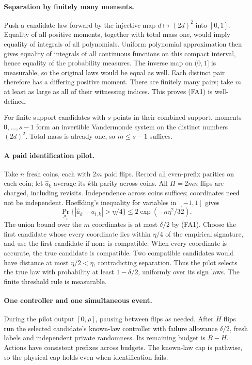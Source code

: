 \paragraph{Separation by finitely many moments.}
Push a candidate law forward by the injective map $d\mapsto(2d)^2$ into
$[0,1]$. Equality of all positive moments, together with total mass one,
would imply equality of integrals of all polynomials. Uniform polynomial
approximation then gives equality of integrals of all continuous functions
on this compact interval, hence equality of the probability measures.
The inverse map on $(0,1]$ is measurable, so the original laws would be
equal as well. Each distinct pair therefore has a differing positive
moment. There are finitely many pairs; take $m$ at least as large as all
of their witnessing indices. This proves (FA1) is well-defined.

For finite-support candidates with $s$ points in their combined support,
moments $0,\ldots,s-1$ form an invertible Vandermonde system on the distinct
numbers $(2d)^2$. Total mass is already one, so $m\le s-1$ suffices.

\paragraph{A paid identification pilot.}
Take $n$ fresh coins, each with $2m$ paid flips. Record all even-prefix
parities on each coin; let $\widehat a_k$ average its $k$th parity across
coins. All $H=2mn$ flips are charged, including revisits. Independence
across coins suffices; coordinates need not be independent.
Hoeffding's inequality for variables in $[-1,1]$ gives
\[
 \Pr_{\mu_i}\{|\widehat a_k-a_{i,k}|>\eta/4\}
 \le2\exp(-n\eta^2/32).
\]
The union bound over the $m$ coordinates is at most $\delta/2$ by (FA1).
Choose the first candidate whose every coordinate lies within $\eta/4$
of the empirical signature, and use the first candidate if none is
compatible. When every coordinate is accurate, the true candidate is
compatible. Two compatible candidates would have distance at most
$\eta/2<\eta$, contradicting separation. Thus the pilot selects the true
law with probability at least $1-\delta/2$, uniformly over its sign laws.
The finite threshold rule is measurable.

\paragraph{One controller and one simultaneous event.}
During the pilot output $[0,\rho]$, pausing between flips as needed.
After $H$ flips run the selected candidate's known-law controller with
failure allowance $\delta/2$, fresh labels and independent private
randomness. Its remaining budget is $B-H$. Actions have consistent
prefixes across budgets. The known-law cap is pathwise, so the physical
cap holds even when identification fails.

